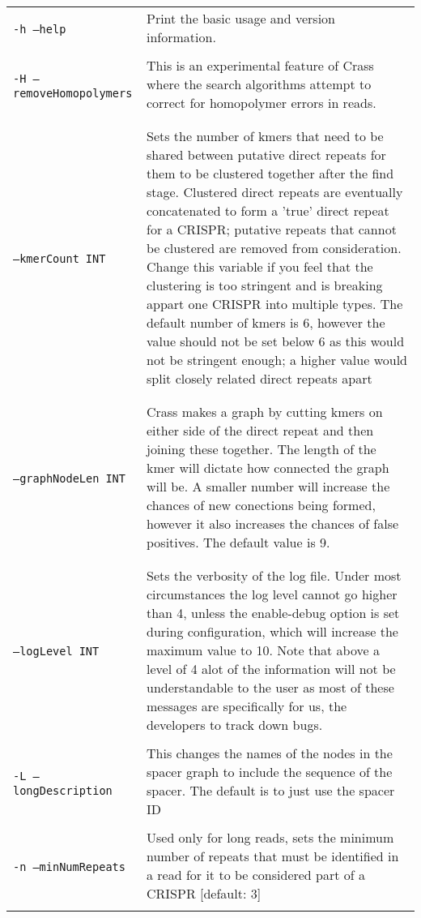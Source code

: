 \documentclass[11pt]{article} %
\newcommand{\optionflag}[1]{\texttt{-#1}}
\newcommand{\optionflagarg}[2]{\optionflag{#1}\ \texttt{#2}}
\newcommand{\longoptionflag}[1]{\texttt{--#1}}
\newcommand{\longoptionflagarg}[2]{\longoptionflag{#1}\ \texttt{#2}}
\newcommand{\combinedoptionflag}[2]{\optionflag{#1}\ \longoptionflag{#2}}
\newcommand{
	\combinedoptionflagarg}[3]{
		\shortstack[l]{
			\optionflagarg{#1}{#3} \\ \longoptionflagarg{#2}{#3}
		}
	}
\begin{document}
\begin{longtable}{  l   p{10cm} }
\combinedoptionflag{h}{help} & Print the basic usage and version information. \\ \\
\combinedoptionflag{H}{removeHomopolymers} & This is an experimental feature of Crass where the search algorithms attempt to correct for homopolymer errors in reads.\\ \\
\combinedoptionflagarg{k}{kmerCount}{INT} & Sets the number of kmers that need to be shared between putative direct repeats for them to be clustered together after the find stage.  Clustered direct repeats are eventually concatenated to form a 'true' direct repeat for a CRISPR; putative repeats that cannot be clustered are removed from consideration.  Change this variable if you feel that the clustering is too stringent and is breaking appart one CRISPR into multiple types.  The default number of kmers is 6, however the value should not be set below 6 as this would not be stringent enough; a higher value would split closely related direct repeats apart\\ \\
\combinedoptionflagarg{K}{graphNodeLen}{INT} & Crass makes a graph by cutting kmers on either side of the direct repeat and then joining these together.  The length of the kmer will dictate how connected the graph will be.  A smaller number will increase the chances of new conections being formed, however it also increases the chances of false positives.  The default value is 9.\\ \\ 
\combinedoptionflagarg{l}{logLevel}{INT} & Sets the verbosity of the log file.  Under most circumstances the log level cannot go higher than 4, unless the enable-debug option is set during configuration, which will increase the maximum value to 10.  Note that above a level of 4 alot of the information will not be understandable to the user as most of these messages are specifically for us, the developers to track down bugs.  \\ \\
\combinedoptionflag{L}{longDescription} & This changes  the names of the nodes in the spacer graph to include the sequence of the spacer.  The default is to just use the spacer ID\\ \\
\combinedoptionflag{n}{minNumRepeats} & Used only for long reads, sets the minimum number of repeats that must be identified in a read for it to be considered part of a CRISPR [default: 3]\\ \\

\end{longtable}
\end{document}
